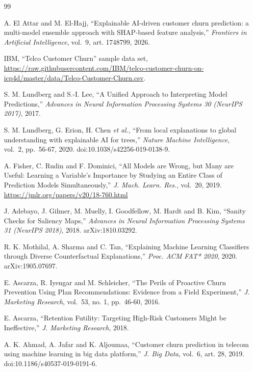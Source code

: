\documentclass[10pt,a4paper]{article}
\begin{document}
\clearpage
\begin{thebibliography}{99}
\small\raggedright
{}
A. El Attar and M. El-Hajj, ``Explainable AI-driven customer churn
  prediction: a multi-model ensemble approach with SHAP-based feature
  analysis,'' \emph{Frontiers in Artificial Intelligence}, vol.~9, art.
  1748799, 2026.

IBM, ``Telco Customer Churn'' sample data set,
  \url{https://raw.githubusercontent.com/IBM/telco-customer-churn-on-icp4d/master/data/Telco-Customer-Churn.csv}.

S. M. Lundberg and S.-I. Lee, ``A Unified Approach to Interpreting
  Model Predictions,'' \emph{Advances in Neural Information Processing
  Systems 30 (NeurIPS 2017)}, 2017.

S. M. Lundberg, G. Erion, H. Chen \emph{et al.}, ``From local
  explanations to global understanding with explainable AI for trees,''
  \emph{Nature Machine Intelligence}, vol.~2, pp.~56-67, 2020.
  doi:10.1038/s42256-019-0138-9.

A. Fisher, C. Rudin and F. Dominici, ``All Models are Wrong, but Many
  are Useful: Learning a Variable's Importance by Studying an Entire
  Class of Prediction Models Simultaneously,'' \emph{J. Mach. Learn.
  Res.}, vol.~20, 2019. \url{https://jmlr.org/papers/v20/18-760.html}

J. Adebayo, J. Gilmer, M. Muelly, I. Goodfellow, M. Hardt and B. Kim,
  ``Sanity Checks for Saliency Maps,'' \emph{Advances in Neural
  Information Processing Systems 31 (NeurIPS 2018)}, 2018.
  arXiv:1810.03292.

R. K. Mothilal, A. Sharma and C. Tan, ``Explaining Machine Learning
  Classifiers through Diverse Counterfactual Explanations,'' \emph{Proc.
  ACM FAT* 2020}, 2020. arXiv:1905.07697.

E. Ascarza, R. Iyengar and M. Schleicher, ``The Perils of Proactive
  Churn Prevention Using Plan Recommendations: Evidence from a Field
  Experiment,'' \emph{J. Marketing Research}, vol.~53, no. 1, pp.~46-60,
  2016.

E. Ascarza, ``Retention Futility: Targeting High-Risk Customers Might
  be Ineffective,'' \emph{J. Marketing Research}, 2018.

A. K. Ahmad, A. Jafar and K. Aljoumaa, ``Customer churn prediction in
  telecom using machine learning in big data platform,'' \emph{J. Big
  Data}, vol.~6, art. 28, 2019. doi:10.1186/s40537-019-0191-6.
\end{thebibliography}
\end{document}
